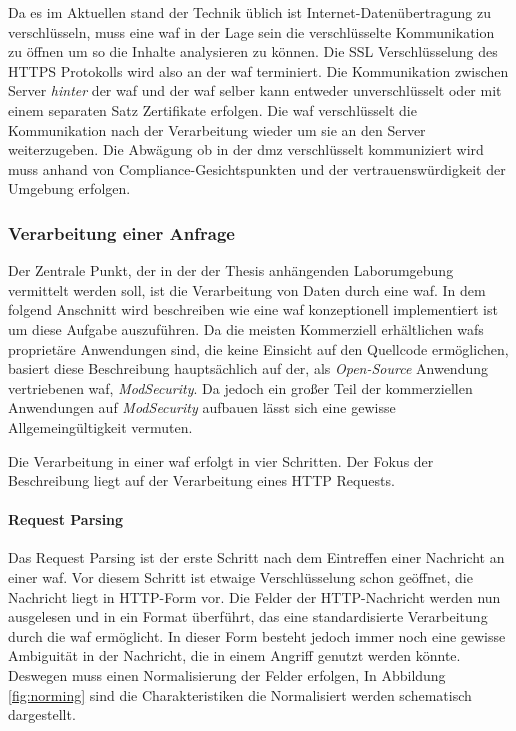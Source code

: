 Da es im Aktuellen stand der Technik üblich ist Internet-Datenübertragung zu verschlüsseln, muss eine \ac{waf} in der Lage sein die verschlüsselte Kommunikation zu öffnen um so die Inhalte analysieren zu können.
Die SSL Verschlüsselung des HTTPS Protokolls wird also an der \ac{waf} terminiert.
Die Kommunikation zwischen Server \textit{hinter} der \ac{waf} und der \ac{waf} selber kann entweder unverschlüsselt oder mit einem separaten Satz Zertifikate erfolgen.
Die \ac{waf} verschlüsselt die Kommunikation nach der Verarbeitung wieder um sie an den Server weiterzugeben.
Die Abwägung ob in der \ac{dmz} verschlüsselt kommuniziert wird muss anhand von Compliance-Gesichtspunkten und der vertrauenswürdigkeit der Umgebung erfolgen\cite{guptaWEBAPPLICATIONFIREWALL2007}.

\subsubsection{Verarbeitung einer Anfrage}\cite{yuanResearchImplementationWEB2019}
Der Zentrale Punkt, der in der der Thesis anhängenden Laborumgebung vermittelt werden soll, ist die Verarbeitung von Daten durch eine \ac{waf}.
In dem folgend Anschnitt wird beschreiben wie eine \ac{waf} konzeptionell implementiert ist um diese Aufgabe auszuführen.
Da die meisten Kommerziell erhältlichen \acp{waf} proprietäre Anwendungen sind, die keine Einsicht auf den Quellcode ermöglichen, basiert diese Beschreibung hauptsächlich auf der, als \textit{Open-Source} Anwendung vertriebenen \ac{waf}, \textit{ModSecurity}.
Da jedoch ein großer Teil der kommerziellen Anwendungen auf \textit{ModSecurity} aufbauen lässt sich eine gewisse Allgemeingültigkeit vermuten.

Die Verarbeitung in einer \ac{waf} erfolgt in vier Schritten. Der Fokus der Beschreibung liegt auf der Verarbeitung eines HTTP Requests.

\paragraph{Request Parsing}
Das Request Parsing ist der erste Schritt nach dem Eintreffen einer Nachricht an einer \ac{waf}.
Vor diesem Schritt ist etwaige Verschlüsselung schon geöffnet, die Nachricht liegt in HTTP-Form vor.
Die Felder der HTTP-Nachricht werden nun ausgelesen und in ein Format überführt, das eine standardisierte Verarbeitung durch die \ac{waf} ermöglicht.
In dieser Form besteht jedoch immer noch eine gewisse Ambiguität in der Nachricht, die in einem Angriff genutzt werden könnte.
Deswegen muss einen Normalisierung der Felder erfolgen,
In Abbildung \ref{fig:norming} sind die Charakteristiken die Normalisiert werden schematisch dargestellt.

